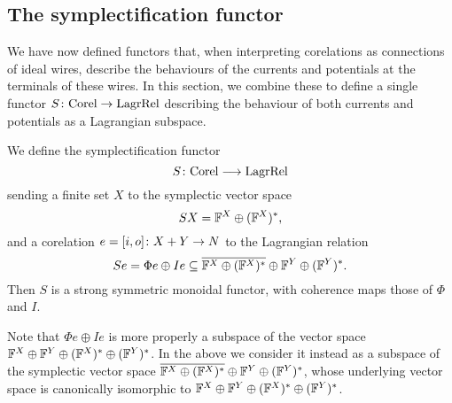 \subsection{The symplectification functor}

We have now defined functors that, when interpreting corelations as connections
of ideal wires, describe the behaviours of the currents and potentials at the
terminals of these wires. In this section, we combine these to define a single
functor $S{\colon} \mathrm{Corel} \to \mathrm{LagrRel}$ describing the behaviour of both
currents and potentials as a Lagrangian subspace.

\begin{proposition} \label{prop:sympfunctor}
  We define the symplectification functor
  \[
    S{\colon} \mathrm{Corel} \longrightarrow \mathrm{LagrRel}
  \]
  sending a finite set $X$ to the symplectic vector space
  \[
    SX = {\mathbb F}^X \oplus ({\mathbb F}^X)^\ast,
  \]
  and a corelation $e=[i,o]{\colon} X+Y \to N$ to the Lagrangian relation
  \[
    Se = \Phi e \oplus Ie \subseteq \overline{{\mathbb F}^X \oplus
    ({\mathbb F}^X)^\ast}\oplus {\mathbb F}^Y \oplus ({\mathbb F}^Y)^\ast.
  \]
  Then $S$ is a strong symmetric monoidal functor, with coherence maps those of
  $\Phi$ and $I$.
\end{proposition}
Note that $\Phi e\oplus Ie$ is more properly a subspace of the vector space ${\mathbb F}^X
\oplus {\mathbb F}^Y \oplus ({\mathbb F}^X)^\ast \oplus ({\mathbb F}^Y)^\ast$. In the above we consider it
instead as a subspace of the symplectic vector space $\overline{{\mathbb F}^X \oplus
({\mathbb F}^X)^\ast}\oplus {\mathbb F}^Y \oplus ({\mathbb F}^Y)^\ast$, whose underlying vector space is
canonically isomorphic to ${\mathbb F}^X \oplus {\mathbb F}^Y \oplus ({\mathbb F}^X)^\ast \oplus
({\mathbb F}^Y)^\ast$.

